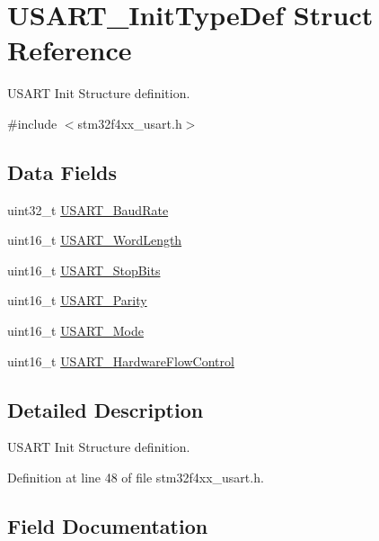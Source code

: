 \hypertarget{struct_u_s_a_r_t___init_type_def}{}\section{U\+S\+A\+R\+T\+\_\+\+Init\+Type\+Def Struct Reference}
\label{struct_u_s_a_r_t___init_type_def}


U\+S\+A\+RT Init Structure definition.  




{\ttfamily \#include $<$stm32f4xx\+\_\+usart.\+h$>$}

\subsection*{Data Fields}
\begin{DoxyCompactItemize}
\item 
uint32\+\_\+t \hyperlink{struct_u_s_a_r_t___init_type_def_a8712e31ee9d088d83c84d38d88c6af0b}{U\+S\+A\+R\+T\+\_\+\+Baud\+Rate}
\item 
uint16\+\_\+t \hyperlink{struct_u_s_a_r_t___init_type_def_aa1248b67914e095c0de768223eea9328}{U\+S\+A\+R\+T\+\_\+\+Word\+Length}
\item 
uint16\+\_\+t \hyperlink{struct_u_s_a_r_t___init_type_def_aa58409990a6a0bc99f432eb90e204c0f}{U\+S\+A\+R\+T\+\_\+\+Stop\+Bits}
\item 
uint16\+\_\+t \hyperlink{struct_u_s_a_r_t___init_type_def_a4edcc84644c8553a1a6e841c48ea8413}{U\+S\+A\+R\+T\+\_\+\+Parity}
\item 
uint16\+\_\+t \hyperlink{struct_u_s_a_r_t___init_type_def_a1a581f24451bf5a4a210bab8d68998e2}{U\+S\+A\+R\+T\+\_\+\+Mode}
\item 
uint16\+\_\+t \hyperlink{struct_u_s_a_r_t___init_type_def_ab41fe3b9f5cb4ed89be23bff0a1f4114}{U\+S\+A\+R\+T\+\_\+\+Hardware\+Flow\+Control}
\end{DoxyCompactItemize}


\subsection{Detailed Description}
U\+S\+A\+RT Init Structure definition. 

Definition at line 48 of file stm32f4xx\+\_\+usart.\+h.



\subsection{Field Documentation}
\mbox{\label{struct_u_s_a_r_t___init_type_def_a8712e31ee9d088d83c84d38d88c6af0b}} 
